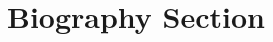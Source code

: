 \documentclass[lettersize,journal]{IEEEtran}
\begin{document}
\newpage

\section{Biography Section}

\vspace{11pt}


\vspace{11pt}

\vfill
\end{document}
